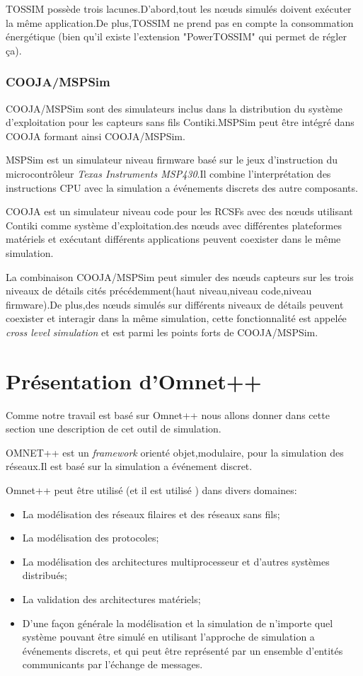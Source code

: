 TOSSIM possède trois lacunes.D'abord,tout les nœuds simulés doivent exécuter la même application.De plus,TOSSIM ne prend pas en compte la consommation énergétique (bien qu'il existe l'extension "PowerTOSSIM" qui permet de régler ça).

\subsubsection{COOJA/MSPSim}
COOJA/MSPSim sont des simulateurs inclus dans la distribution du système d'exploitation pour les capteurs sans fils Contiki.MSPSim peut être intégré dans COOJA formant ainsi COOJA/MSPSim.

MSPSim est un simulateur niveau firmware basé sur le jeux d'instruction du microcontrôleur \emph{Texas Instruments MSP430}.Il combine l'interprétation des instructions CPU avec la simulation a événements discrets des autre composants.

COOJA est un simulateur niveau code pour les RCSFs avec des nœuds utilisant Contiki comme système d'exploitation.des nœuds avec différentes  plateformes matériels et exécutant différents applications peuvent coexister dans le même simulation.

La combinaison COOJA/MSPSim peut simuler des nœuds capteurs sur les trois niveaux de détails cités précédemment(haut niveau,niveau code,niveau firmware).De plus,des nœuds simulés sur différents niveaux de détails peuvent coexister et interagir dans la même simulation,
cette fonctionnalité est appelée \emph{cross level simulation} et est parmi les points forts de COOJA/MSPSim.

\section{Présentation d'Omnet++}
Comme notre travail est basé sur Omnet++ nous allons donner dans cette section une description de cet outil de simulation.

OMNET++ est un \emph{framework} orienté objet,modulaire, pour la simulation des réseaux.Il est basé sur la simulation a événement discret.

Omnet++ peut être utilisé (et il est utilisé ) dans divers domaines:
\begin{itemize}
\item La modélisation des réseaux filaires et des réseaux sans fils; 
\item La modélisation des protocoles;
\item La modélisation des architectures multiprocesseur et d'autres systèmes distribués;
\item La validation des architectures matériels;
\item D'une façon générale la modélisation et la simulation de n'importe quel système pouvant être simulé en utilisant l'approche de simulation a événements discrets, et qui peut être représenté par un ensemble d'entités communicants par l'échange de messages.
\end{itemize}

